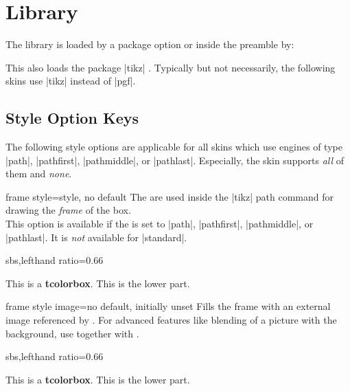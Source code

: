\clearpage
\section{Library }\label{sec:skins}%
%
The library is loaded by a package option or inside the preamble by:
\begin{dispListing}
\end{dispListing}
This also loads the package |tikz| \cite{tantau:2013a}. Typically but not necessarily,
the following skins use |tikz| instead of |pgf|.

\subsection{Style Option Keys}\label{subsec:addstyleoptions}
The following style options are applicable for all skins which
use engines of type |path|, |pathfirst|, |pathmiddle|, or |pathlast|.
Especially, the skin  supports \emph{all} of them
and  \emph{none}.

\begin{docTcbKey}{frame style}{=}{style, no default}
  The  are used inside the |tikz| path command
  for drawing the \emph{frame} of the box.\\
  This option is available if the  is set to
  |path|, |pathfirst|, |pathmiddle|, or |pathlast|.
  It is \emph{not} available for |standard|.
\begin{dispExample*}{sbs,lefthand ratio=0.66}

\begin{tcolorbox}[enhanced,title=My title,
  frame style={left color=red!75!black,
               right color=blue!75!black}]
This is a \textbf{tcolorbox}.
\tcblower
This is the lower part.
\end{tcolorbox}
\end{dispExample*}
\end{docTcbKey}


\begin{docTcbKey}{frame style image}{=}{no default, initially unset}
  Fills the frame with an external image referenced by .
  For advanced features like blending of a picture with the background,
  use  together with .
\begin{dispExample*}{sbs,lefthand ratio=0.66}

\begin{tcolorbox}[enhanced,title=My title,
  frame style image=blueshade.png]
This is a \textbf{tcolorbox}.
\tcblower
This is the lower part.
\end{tcolorbox}
\end{dispExample*}
\end{docTcbKey}

